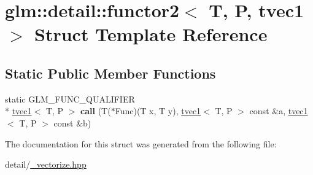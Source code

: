 \hypertarget{structglm_1_1detail_1_1functor2_3_01T_00_01P_00_01tvec1_01_4}{\section{glm\-:\-:detail\-:\-:functor2$<$ T, P, tvec1 $>$ Struct Template Reference}
\label{structglm_1_1detail_1_1functor2_3_01T_00_01P_00_01tvec1_01_4}
}
\subsection*{Static Public Member Functions}
\begin{DoxyCompactItemize}
\item 
\hypertarget{structglm_1_1detail_1_1functor2_3_01T_00_01P_00_01tvec1_01_4_a7f805874487ee439ec9f5ca600f1813d}{static G\-L\-M\-\_\-\-F\-U\-N\-C\-\_\-\-Q\-U\-A\-L\-I\-F\-I\-E\-R \\*
\hyperlink{structglm_1_1tvec1}{tvec1}$<$ T, P $>$ {\bfseries call} (T($\ast$Func)(T x, T y), \hyperlink{structglm_1_1tvec1}{tvec1}$<$ T, P $>$ const \&a, \hyperlink{structglm_1_1tvec1}{tvec1}$<$ T, P $>$ const \&b)}\label{structglm_1_1detail_1_1functor2_3_01T_00_01P_00_01tvec1_01_4_a7f805874487ee439ec9f5ca600f1813d}

\end{DoxyCompactItemize}


The documentation for this struct was generated from the following file\-:\begin{DoxyCompactItemize}
\item 
detail/\hyperlink{__vectorize_8hpp}{\-\_\-vectorize.\-hpp}\end{DoxyCompactItemize}
